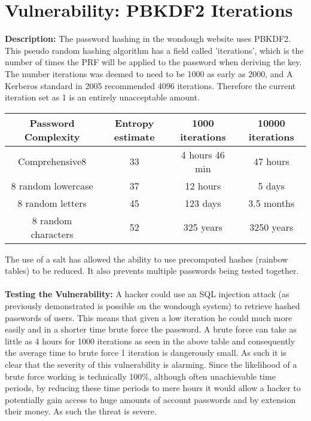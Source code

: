 \section{Vulnerability: PBKDF2 Iterations}
\label{sec:background}
\textbf{Description:} The password hashing in the wondough website uses PBKDF2. This pseudo random hashing algorithm has a field called 'iterations', which is the number of times
the PRF will be applied to the password when deriving the key. The number iterations was deemed to need to be 1000 as early as 2000, and A Kerberos standard in 2005 recommended
4096 iterations. Therefore the current iteration set as 1 is an entirely unacceptable amount\cite{Cyrptosense2015}.\begin{center}
   \begin{tabular}{ |c|c|c|c| }
    \hline
    Password Complexity & Entropy estimate & 1000 iterations &  10000 iterations\\
    \hline
    Comprehensive8 & 33 & 4 hours 46 min & 47 hours \\
    8 random lowercase & 37 & 12 hours & 5 days \\
    8 random letters & 45 & 123 days & 3.5 months \\
    8 random characters & 52 & 325 years & 3250 years \\
    \hline
   \end{tabular}
   \end{center}
The use of a salt has allowed the ability to use precomputed hashes (rainbow tables) to be reduced. It also prevents multiple passwords being tested together. \\ \\
\textbf{Testing the Vulnerability:} A hacker could use an SQL injection attack (as previously demonstrated is possible on the wondough system) to retrieve hashed passwords of
users. This means that given a low iteration he could much more easily and in a shorter time brute force the password. A brute force can take as little as 4 hours for 1000
iterations as seen in the above table and consequently the average time to brute force 1 iteration is dangerously small. As such it is clear that the severity of this vulnerability
is alarming. Since the likelihood of a brute force working is technically 100\%, although often unachievable time periods, by reducing these time periods to mere hours it
would allow a hacker to potentially gain access to huge amounts of account passwords and by extension their money. As such the threat is severe. \\ \\

